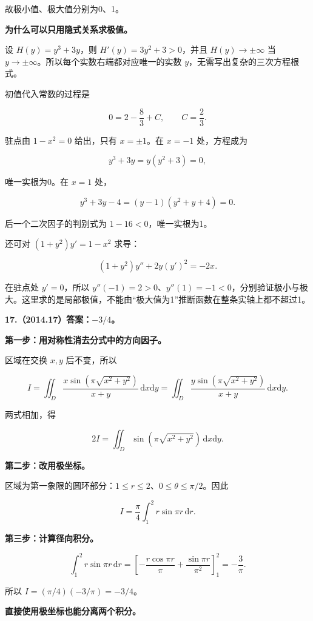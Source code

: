 \documentclass[UTF8,11pt,fontset=windows]{ctexart}
\begin{document}
故极小值、极大值分别为0、1。

\textbf{为什么可以只用隐式关系求极值。}

设 $H(y)=y^3+3y$，则 $H'(y)=3y^2+3>0$，并且 $H(y)\to\pm\infty$ 当 $y\to\pm\infty$。所以每个实数右端都对应唯一的实数 $y$，无需写出复杂的三次方程根式。

初值代入常数的过程是

$$
0=2-\frac83+C,
\qquad C=\frac23.
$$

驻点由 $1-x^2=0$ 给出，只有 $x=\pm1$。在 $x=-1$ 处，方程成为

$$
y^3+3y=y(y^2+3)=0,
$$

唯一实根为0。在 $x=1$ 处，

$$
y^3+3y-4=(y-1)(y^2+y+4)=0.
$$

后一个二次因子的判别式为 $1-16<0$，唯一实根为1。

还可对 $(1+y^2)y'=1-x^2$ 求导：

$$
(1+y^2)y''+2y(y')^2=-2x.
$$

在驻点处 $y'=0$，所以 $y''(-1)=2>0$、$y''(1)=-1<0$，分别验证极小与极大。这里求的是局部极值，不能由“极大值为1”推断函数在整条实轴上都不超过1。

\clearpage

\textbf{17.（2014.17）答案：$-3/4$。}

\textbf{第一步：用对称性消去分式中的方向因子。}

区域在交换 $x,y$ 后不变，所以

$$
I=\iint_D\frac{x\sin(\pi\sqrt{x^2+y^2})}{x+y}\,\mathrm dx\mathrm dy
=\iint_D\frac{y\sin(\pi\sqrt{x^2+y^2})}{x+y}\,\mathrm dx\mathrm dy.
$$

两式相加，得

$$
2I=\iint_D\sin(\pi\sqrt{x^2+y^2})\,\mathrm dx\mathrm dy.
$$

\textbf{第二步：改用极坐标。}

区域为第一象限的圆环部分：$1\le r\le2$、$0\le\theta\le\pi/2$。因此

$$
I=\frac\pi4\int_1^2 r\sin\pi r\,\mathrm dr.
$$

\textbf{第三步：计算径向积分。}

$$
\int_1^2r\sin\pi r\,\mathrm dr
=\left[-\frac{r\cos\pi r}{\pi}+\frac{\sin\pi r}{\pi^2}\right]_1^2
=-\frac3\pi.
$$

所以 $I=(\pi/4)(-3/\pi)=-3/4$。

\textbf{直接使用极坐标也能分离两个积分。}
\end{document}
